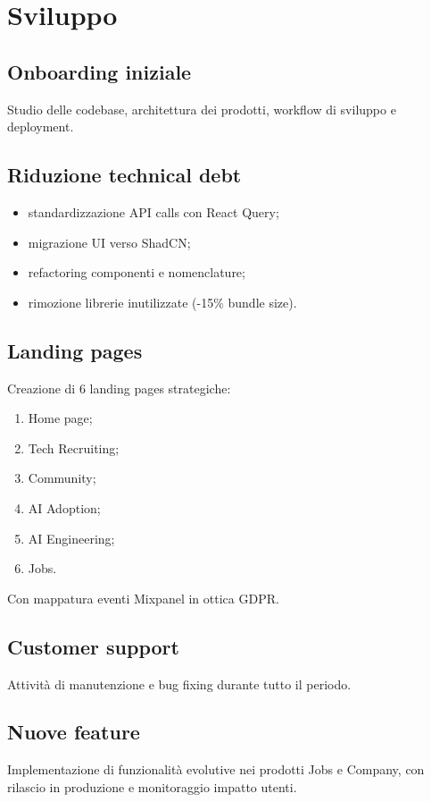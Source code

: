 \chapter{Sviluppo}
\section{Onboarding iniziale}
Studio delle codebase, architettura dei prodotti, workflow di sviluppo e deployment.

\section{Riduzione technical debt}
\begin{itemize}
  \item standardizzazione API calls con React Query;
  \item migrazione UI verso ShadCN;
  \item refactoring componenti e nomenclature;
  \item rimozione librerie inutilizzate (-15\% bundle size).
\end{itemize}

\section{Landing pages}
Creazione di 6 landing pages strategiche:
\begin{enumerate}
  \item Home page;
  \item Tech Recruiting;
  \item Community;
  \item AI Adoption;
  \item AI Engineering;
  \item Jobs.
\end{enumerate}
Con mappatura eventi Mixpanel in ottica GDPR.

\section{Customer support}
Attività di manutenzione e bug fixing durante tutto il periodo.

\section{Nuove feature}
Implementazione di funzionalità evolutive nei prodotti Jobs e Company, con rilascio in produzione e monitoraggio impatto utenti.